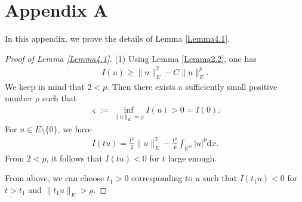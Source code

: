 \documentclass[12pt,a4paper,reqno]{amsart}
\numberwithin{equation}{section}
\begin{document}
\section*{Appendix A}
In this appendix, we prove the details of Lemma \ref{Lemma4.1}.
\begin{proof}[Proof of Lemma \ref{Lemma4.1}]
(1) Using Lemma \ref{Lemma2.2}, one has
\begin{equation*}
\begin{aligned}
I(u)
\geqslant \|u\|_{E}^{2}
-C\|u\|_{E}^{p}.
\end{aligned}
\end{equation*}
We keep in mind that $2<p$. Then there exists a sufficiently small positive number $\rho$ such that
\begin{equation*}
\begin{aligned}
\varsigma :=
\inf_{\|u\|_{E}=\rho}
I(u)>0=I(0).
\end{aligned}
\end{equation*}
For $u\in E\setminus\{0\}$, we have
\begin{equation*}
\begin{aligned}
I(tu)
=
\frac{t^{2}}{2}
\|u\|_{E}^{2}
-\frac{t^{p}}{p}
\int_{\mathbb{R}^{N}}|u|^{p}\mathrm{d}x.
\end{aligned}
\end{equation*}
From $2<p$, it follows that $I(tu)<0$ for $t$ large enough.

From above,
we can choose $t_{1}>0$ corresponding to $u$ such that $I(t_{1}u)<0$ for $t>t_{1}$ and $\|t_{1}u\|_{E}>\rho$.


\end{proof}
\end{document}
